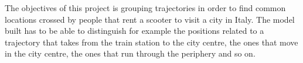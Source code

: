 The objectives of this project is grouping trajectories in order to find common locations crossed by people that rent a scooter to visit a city in Italy. The model built has to be able to distinguish for example the positions related to a trajectory that takes from the train station to the city centre, the ones that move in the city centre, the ones that run through the periphery and so on.